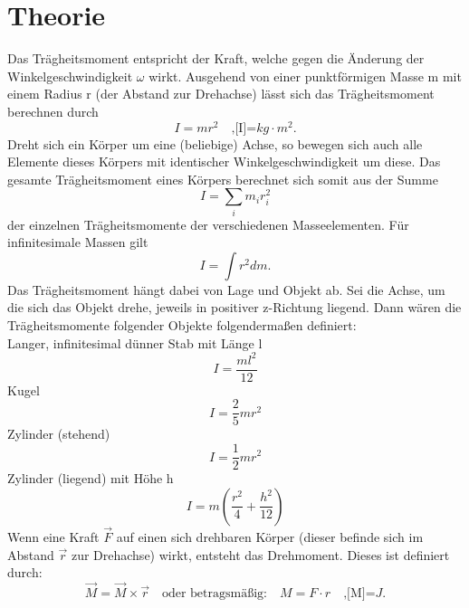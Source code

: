 \section{Theorie}
\label{sec:Theorie}

Das Trägheitsmoment entspricht der Kraft, welche gegen die Änderung der
Winkelgeschwindigkeit $\omega$ wirkt. Ausgehend von einer punktförmigen 
Masse m mit einem Radius r (der Abstand zur Drehachse) lässt sich das 
Trägheitsmoment berechnen durch
\begin{equation}
    I = m r^2 \quad \text{,[I]=} kg \cdot m^2.
    \label{eqn:gl1}
\end{equation}
\noindent Dreht sich ein Körper um eine (beliebige) Achse, so bewegen sich auch alle
Elemente dieses Körpers mit identischer Winkelgeschwindigkeit um diese. Das
gesamte Trägheitsmoment eines Körpers berechnet sich somit aus der Summe
\begin{equation}
    I = \sum\limits_{i} m_i r_i^2
    \label{eqn:gl2}
\end{equation}
\noindent der einzelnen Trägheitsmomente der verschiedenen Masseelementen. Für
infinitesimale Massen gilt
\begin{equation}
    I = \int r^2 dm .
    \label{eqn:gl3}
\end{equation}
\noindent Das Trägheitsmoment hängt dabei von Lage und Objekt ab. Sei die
Achse, um die sich das Objekt drehe, jeweils in positiver z-Richtung liegend.
Dann wären die Trägheitsmomente folgender Objekte folgendermaßen definiert:\\
\noindent Langer, infinitesimal dünner Stab mit Länge l
\begin{equation}
    I = \frac{ml^2}{12}
    \label{eqn:gl4}
\end{equation}
Kugel
\begin{equation}
    I = \frac{2}{5} m r^2
    \label{eqn:gl5}
\end{equation}
Zylinder (stehend)
\begin{equation}
    I = \frac{1}{2} m r^2
    \label{eqn:gl6}
\end{equation}
Zylinder (liegend) mit Höhe h
\begin{equation}
    I = m \left(\frac{r^2}{4} + \frac{h^2}{12} \right) 
    \label{eqn:gl7}
\end{equation}
Wenn eine Kraft $\vec{F}$ auf einen sich drehbaren Körper (dieser befinde
sich im Abstand $\vec{r}$ zur Drehachse) wirkt, entsteht das Drehmoment.
Dieses ist definiert durch:
\begin{equation}
    \vec{M} = \vec{M} \times \vec{r} \quad \text{oder betragsmäßig:} 
    \quad M = F \cdot r \quad \text{,[M]=} J.\end{equation}
